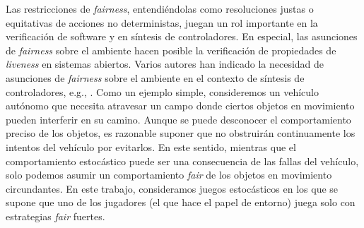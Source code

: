 Las restricciones de \textit{fairness}, entendiéndolas como resoluciones justas o equitativas de acciones no deterministas, juegan un rol importante en la verificación de software y en síntesis de controladores.
En especial, las asunciones de \textit{fairness} sobre el ambiente hacen posible la verificación de propiedades de \textit{liveness} en sistemas abiertos. 
Varios autores han indicado la necesidad de asunciones de \textit{fairness} sobre el ambiente en el contexto de síntesis de controladores, e.g., \cite{DBLP:conf/fossacs/AsarinCV10, DBLP:conf/icse/DIppolitoBPU11}.
Como un ejemplo simple, consideremos un vehículo autónomo que necesita atravesar un campo donde ciertos objetos en movimiento pueden interferir en su camino. Aunque se puede desconocer el comportamiento preciso de los objetos, es razonable suponer que no obstruirán continuamente los intentos del vehículo por evitarlos. En este sentido, mientras que el comportamiento estocástico puede ser una consecuencia de las fallas del vehículo, solo podemos asumir un comportamiento \textit{fair} de los objetos en movimiento circundantes.
En este trabajo, consideramos juegos estocásticos en los que se supone que uno de los jugadores (el que hace el papel de entorno) juega solo con estrategias \textit{fair} fuertes.

